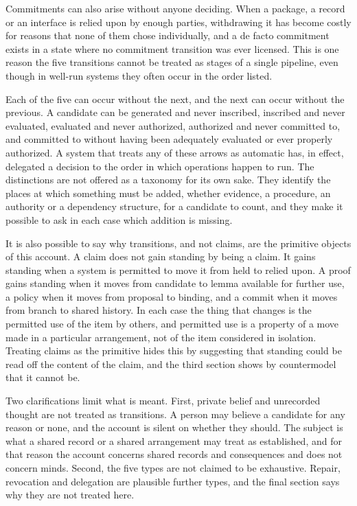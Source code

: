 Commitments can also arise without anyone deciding. When a package, a record or an interface is relied upon by enough parties, withdrawing it has become costly for reasons that none of them chose individually, and a de facto commitment exists in a state where no commitment transition was ever licensed. This is one reason the five transitions cannot be treated as stages of a single pipeline, even though in well-run systems they often occur in the order listed.

Each of the five can occur without the next, and the next can occur without the previous. A candidate can be generated and never inscribed, inscribed and never evaluated, evaluated and never authorized, authorized and never committed to, and committed to without having been adequately evaluated or ever properly authorized. A system that treats any of these arrows as automatic has, in effect, delegated a decision to the order in which operations happen to run. The distinctions are not offered as a taxonomy for its own sake. They identify the places at which something must be added, whether evidence, a procedure, an authority or a dependency structure, for a candidate to count, and they make it possible to ask in each case which addition is missing.

It is also possible to say why transitions, and not claims, are the primitive objects of this account. A claim does not gain standing by being a claim. It gains standing when a system is permitted to move it from held to relied upon. A proof gains standing when it moves from candidate to lemma available for further use, a policy when it moves from proposal to binding, and a commit when it moves from branch to shared history. In each case the thing that changes is the permitted use of the item by others, and permitted use is a property of a move made in a particular arrangement, not of the item considered in isolation. Treating claims as the primitive hides this by suggesting that standing could be read off the content of the claim, and the third section shows by countermodel that it cannot be.

Two clarifications limit what is meant. First, private belief and unrecorded thought are not treated as transitions. A person may believe a candidate for any reason or none, and the account is silent on whether they should. The subject is what a shared record or a shared arrangement may treat as established, and for that reason the account concerns shared records and consequences and does not concern minds. Second, the five types are not claimed to be exhaustive. Repair, revocation and delegation are plausible further types, and the final section says why they are not treated here.

